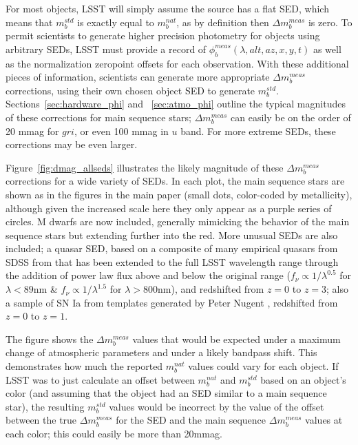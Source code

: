 \documentclass[12pt,preprint]{aastex}
\begin{document}
For most objects, LSST will simply assume the source has a flat SED,
which means that $m_b^{std}$ is exactly equal to $m_b^{nat}$, as by
definition then $\Delta m_b^{meas}$ is zero. To permit scientists to
generate higher precision photometry for objects using arbitrary SEDs,
LSST must provide a record of $\phi_b^{meas}(\lambda,alt,az,x,y,t)$ as
well as the normalization zeropoint offsets for each observation. With
these additional pieces of information, scientists can generate more
appropriate $\Delta m_b^{meas}$ corrections, using their own chosen
object SED to generate $m_b^{std}$. Sections~\ref{sec:hardware_phi}
and ~\ref{sec:atmo_phi} outline the typical magnitudes of these
corrections for main sequence stars; $\Delta m_b^{meas}$ can easily be
on the order of 20 mmag for $gri$, or even 100 mmag in $u$ band. For
more extreme SEDs, these corrections may be even larger.

Figure~\ref{fig:dmag_allseds} illustrates the likely magnitude of
these $\Delta m_b^{meas}$ corrections for a wide variety of SEDs. In
each plot, the main sequence stars are shown as in the figures in the
main paper (small dots, color-coded by metallicity), although given
the increased scale here they only appear as a purple series of
circles. M dwarfs are now included, generally mimicking the behavior
of the main sequence stars but extending further into the red. More
unusual SEDs are also included; a quasar SED, based on a composite of
many empirical quasars from SDSS from \citet{VandenBerk2001} that has
been extended to the full LSST wavelength range through the addition
of power law flux above and below the original range ($f_\nu \propto
1/\lambda^{0.5}$ for $\lambda<89$nm \& $f_\nu \propto 1/\lambda^{1.5}$
for $\lambda>800$nm), and redshifted from $z=0$ to $z=3$; also a
sample of SN Ia from templates generated by Peter Nugent
\citep{Nugent2002}, redshifted from $z=0$ to $z=1$.

The figure shows the $\Delta m_b^{meas}$ values that would be expected
under a maximum change of atmospheric parameters and under a likely
bandpass shift. This demonstrates how much the reported $m_b^{nat}$
values could vary for each object. If LSST was to just calculate an
offset between $m_b^{nat}$ and $m_b^{std}$ based on an object's color
(and assuming that the object had an SED similar to a main sequence
star), the resulting $m_b^{std}$ values would be incorrect by the
value of the offset between the true $\Delta m_b^{meas}$ for the SED
and the main sequence $\Delta m_b^{meas}$ values at each color; this
could easily be more than 20mmag.  
\end{document}
